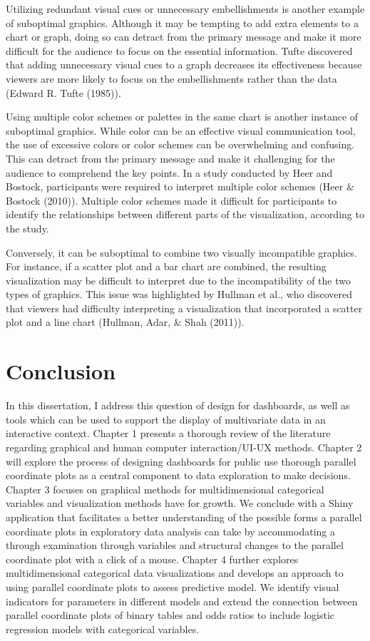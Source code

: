 \documentclass[print]{nuthesis}
\begin{document}
Utilizing redundant visual cues or unnecessary embellishments is another example of suboptimal graphics.
Although it may be tempting to add extra elements to a chart or graph, doing so can detract from the primary message and make it more difficult for the audience to focus on the essential information.
Tufte discovered that adding unnecessary visual cues to a graph decreases its effectiveness because viewers are more likely to focus on the embellishments rather than the data (Edward R. Tufte (1985)).

Using multiple color schemes or palettes in the same chart is another instance of suboptimal graphics.
While color can be an effective visual communication tool, the use of excessive colors or color schemes can be overwhelming and confusing.
This can detract from the primary message and make it challenging for the audience to comprehend the key points.
In a study conducted by Heer and Bostock, participants were required to interpret multiple color schemes (Heer \& Bostock (2010)).
Multiple color schemes made it difficult for participants to identify the relationships between different parts of the visualization, according to the study.

Conversely, it can be suboptimal to combine two visually incompatible graphics.
For instance, if a scatter plot and a bar chart are combined, the resulting visualization may be difficult to interpret due to the incompatibility of the two types of graphics.
This issue was highlighted by Hullman et al., who discovered that viewers had difficulty interpreting a visualization that incorporated a scatter plot and a line chart (Hullman, Adar, \& Shah (2011)).

\hypertarget{conclusion}{%
\section{Conclusion}\label{conclusion}}

In this dissertation, I address this question of design for dashboards, as well as tools which can be used to support the display of multivariate data in an interactive context.
Chapter 1 presents a thorough review of the literature regarding graphical and human computer interaction/UI-UX methods.
Chapter 2 will explore the process of designing dashboards for public use thorough parallel coordinate plots as a central component to data exploration to make decisions.
Chapter 3 focuses on graphical methods for multidimensional categorical variables and visualization methods have for growth.
We conclude with a Shiny application that facilitates a better understanding of the possible forms a parallel coordinate plots in exploratory data analysis can take by accommodating a through examination through variables and structural changes to the parallel coordinate plot with a click of a mouse.
Chapter 4 further explores multidimensional categorical data visualizations and develops an approach to using parallel coordinate plots to assess predictive model.
We identify visual indicators for parameters in different models and extend the connection between parallel coordinate plots of binary tables and odds ratios to include logistic regression models with categorical variables.
\end{document}
